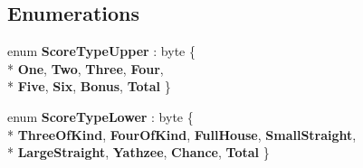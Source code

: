 \subsection*{Enumerations}
\begin{DoxyCompactItemize}
\item 
enum {\bfseries Score\+Type\+Upper} \+: byte \{ \\*
{\bfseries One}, 
{\bfseries Two}, 
{\bfseries Three}, 
{\bfseries Four}, 
\\*
{\bfseries Five}, 
{\bfseries Six}, 
{\bfseries Bonus}, 
{\bfseries Total}
 \}\hypertarget{namespace_yathzee_af9eae2784d7776b80bb77da141a63b7f}{}\label{namespace_yathzee_af9eae2784d7776b80bb77da141a63b7f}

\item 
enum {\bfseries Score\+Type\+Lower} \+: byte \{ \\*
{\bfseries Three\+Of\+Kind}, 
{\bfseries Four\+Of\+Kind}, 
{\bfseries Full\+House}, 
{\bfseries Small\+Straight}, 
\\*
{\bfseries Large\+Straight}, 
{\bfseries Yathzee}, 
{\bfseries Chance}, 
{\bfseries Total}
 \}\hypertarget{namespace_yathzee_ae036ce06cdf75e284ea1cd78a457ef70}{}\label{namespace_yathzee_ae036ce06cdf75e284ea1cd78a457ef70}

\end{DoxyCompactItemize}
